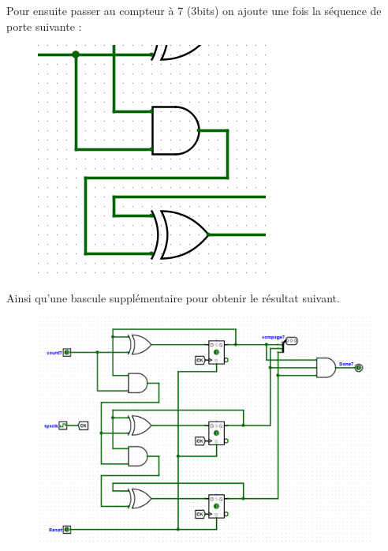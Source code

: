 \documentclass[a4paper]{article} %
\begin{document}
\begin{tcolorbox}[colframe=Monokaimagenta,colback=white, breakable, enhanced]
Pour ensuite passer au compteur à 7 (3bits) on ajoute une fois la séquence de porte suivante :
\begin{figure}[H]
	\centering
	\includegraphics[]{src/sequence_CPT3}
	\label{fig:sequence_CPT3}
\end{figure}

Ainsi qu'une bascule supplémentaire pour obtenir le résultat suivant.

\begin{figure}[H]
	\centering
	\includegraphics[width=\textwidth]{src/CPT_07}
	\label{fig:CPT_07}
\end{figure}




\end{tcolorbox}
\end{document}
